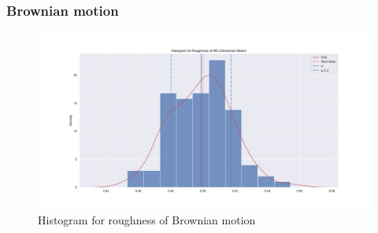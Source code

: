         \subsubsection{Brownian motion}
            \begin{figure}
                \centering
                \includegraphics[width=\linewidth]{fig/Histogram for Roughness of MC-d Brownian Motion.pdf}
                \caption{Histogram for roughness of Brownian motion}
            \end{figure}

